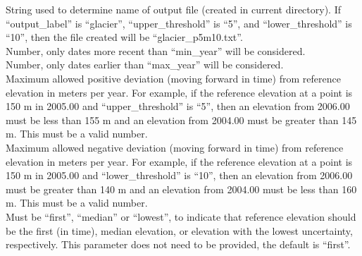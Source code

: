 \documentclass[12pt]{article}
\begin{document}
 String used to determine name of output file (created in current directory).
If ``output\_label'' is ``glacier'', ``upper\_threshold'' is ``5'', and ``lower\_threshold'' is ``10'', then the file created will be ``glacier\_p5m10.txt''. \\

 Number, only dates more recent than ``min\_year'' will be considered. \\

 Number, only dates earlier than ``max\_year'' will be considered. \\

 Maximum allowed positive deviation (moving forward in time) from reference elevation in meters per year.
For example, if the reference elevation at a point is 150 m in 2005.00 and ``upper\_threshold'' is ``5'', then an elevation from 2006.00 must be less than 155 m and an elevation from 2004.00 must be greater than 145 m.
This must be a valid number. \\

 Maximum allowed negative deviation (moving forward in time) from reference elevation in meters per year.
For example, if the reference elevation at a point is 150 m in 2005.00 and ``lower\_threshold'' is ``10'', then an elevation from 2006.00 must be greater than 140 m and an elevation from 2004.00 must be less than 160 m.
This must be a valid number. \\

 Must be ``first'', ``median'' or ``lowest'', to indicate that reference elevation should be the first (in time), median elevation, or elevation with the lowest uncertainty, respectively.
This parameter does not need to be provided, the default is ``first''. \\

 \\
\end{document}
